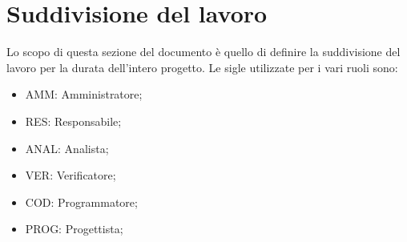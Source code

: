 \chapter{Suddivisione del lavoro}
Lo scopo di questa sezione del documento è quello di definire la suddivisione del lavoro per la durata dell'intero progetto.
Le sigle utilizzate per i vari ruoli sono:
\begin{itemize}
	\item AMM: Amministratore;
	\item RES: Responsabile;
	\item ANAL: Analista;
	\item VER: Verificatore;
	\item COD: Programmatore;
	\item PROG: Progettista;
\end{itemize}
